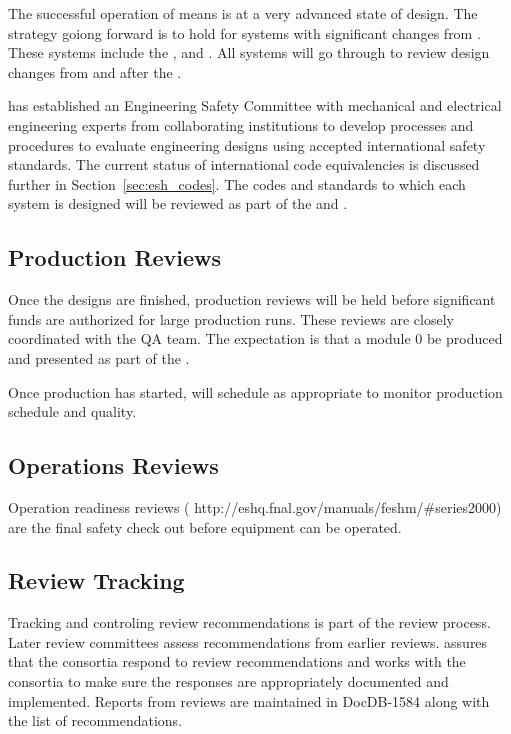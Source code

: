 The successful operation of  means  is at
a very advanced state of design. The strategy goiong forward is to
hold  for systems with significant changes from
. These systems include the ,  and
. All systems will go through  to review
design changes from  and  after the
.

 has established an Engineering Safety Committee with
mechanical and electrical engineering experts from collaborating
institutions to develop processes and procedures to evaluate engineering designs using accepted international safety
standards. The current status of international code equivalencies is
discussed further in Section~\ref{sec:esh_codes}. The codes and
standards to which each system is designed will be reviewed as part of
the  and .

\subsection{Production Reviews}

Once the designs are finished, production reviews will be held
before significant funds are authorized for large production
runs. These reviews are closely coordinated with the QA team. The
expectation is that a module 0 be produced and presented as part of the .

Once production has started,  will schedule 
as appropriate to monitor production schedule and quality.

\subsection{Operations Reviews}

Operation readiness reviews (
http://eshq.fnal.gov/manuals/feshm/\#series2000) are the final safety
check out before equipment can be operated.

\subsection{Review Tracking}

Tracking and controling review recommendations is part of the review
process. Later review committees assess recommendations from earlier reviews.  assures that
the consortia respond to review recommendations and 
works with the consortia to make sure the responses are appropriately documented and
implemented. Reports from  reviews are maintained in
DocDB-1584 along with the list of recommendations.


